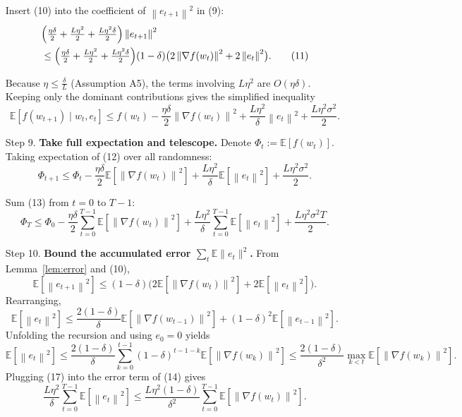 \documentclass{article}
\newcommand{\E}{\mathbb{E}}
\newcommand{\norm}[1]{\left\|#1\right\|}
\begin{document}
\begin{enumerate}
Insert (10) into the coefficient of $\norm{e_{t+1}}^{2}$ in (9):
\[
\begin{aligned}
&\Bigl(\tfrac{\eta\delta}{2}+ \tfrac{L\eta^{2}}{2}
            +\tfrac{L\eta^{2}\delta}{2}\Bigr)\norm{e_{t+1}}^{2}  \\
&\le \Bigl(\tfrac{\eta\delta}{2}+ \tfrac{L\eta^{2}}{2}
            +\tfrac{L\eta^{2}\delta}{2}\Bigr)(1-\delta)
      \bigl(2\norm{\nabla f(w_{t})}^{2}+2\norm{e_{t}}^{2}\bigr). \tag{11}
\end{aligned}
\]

Because $\eta\le \frac{\delta}{L}$ (Assumption A5), the terms involving $L\eta^{2}$
are $O(\eta\delta)$.  Keeping only the dominant contributions gives the simplified
inequality
\[
\E\!\left[f(w_{t+1})\mid w_{t},e_{t}\right]
\le f(w_{t})
      -\frac{\eta\delta}{2}\norm{\nabla f(w_{t})}^{2}
      +\frac{L\eta^{2}}{\delta}\norm{e_{t}}^{2}
      +\frac{L\eta^{2}\sigma^{2}}{2}. \tag{12}
\]

\item[Step 9.] \textbf{Take full expectation and telescope.}
Denote $\Phi_{t}:=\E[f(w_{t})]$. Taking expectation of (12) over all randomness:
\[
\Phi_{t+1}\le \Phi_{t}
      -\frac{\eta\delta}{2}\E\!\left[\norm{\nabla f(w_{t})}^{2}\right]
      +\frac{L\eta^{2}}{\delta}\E\!\left[\norm{e_{t}}^{2}\right]
      +\frac{L\eta^{2}\sigma^{2}}{2}. \tag{13}
\]

Sum (13) from $t=0$ to $T-1$:
\[
\Phi_{T}\le \Phi_{0}
      -\frac{\eta\delta}{2}\sum_{t=0}^{T-1}
          \E\!\left[\norm{\nabla f(w_{t})}^{2}\right]
      +\frac{L\eta^{2}}{\delta}\sum_{t=0}^{T-1}
          \E\!\left[\norm{e_{t}}^{2}\right]
      +\frac{L\eta^{2}\sigma^{2}T}{2}. \tag{14}
\]

\item[Step 10.] \textbf{Bound the accumulated error $\sum_{t}\E\|e_{t}\|^{2}$.}
From Lemma~\ref{lem:error} and (10),
\[
\E\!\left[\norm{e_{t+1}}^{2}\right]\le (1-\delta)
      \bigl(2\E\!\left[\norm{\nabla f(w_{t})}^{2}\right]
            +2\E\!\left[\norm{e_{t}}^{2}\right]\bigr). \tag{15}
\]
Rearranging,
\[
\E\!\left[\norm{e_{t}}^{2}\right]\le
\frac{2(1-\delta)}{\delta}\E\!\left[\norm{\nabla f(w_{t-1})}^{2}\right]
     + (1-\delta)^{2}\E\!\left[\norm{e_{t-1}}^{2}\right]. \tag{16}
\]
Unfolding the recursion and using $e_{0}=0$ yields
\[
\E\!\left[\norm{e_{t}}^{2}\right]\le
\frac{2(1-\delta)}{\delta}\sum_{k=0}^{t-1}(1-\delta)^{t-1-k}
      \E\!\left[\norm{\nabla f(w_{k})}^{2}\right]
\le\frac{2(1-\delta)}{\delta^{2}}\max_{k<t}\E\!\left[\norm{\nabla f(w_{k})}^{2}\right].
\tag{17}
\]
Plugging (17) into the error term of (14) gives
\[
\frac{L\eta^{2}}{\delta}\sum_{t=0}^{T-1}\E\!\left[\norm{e_{t}}^{2}\right]
\le
\frac{L\eta^{2}(1-\delta)}{\delta^{2}}\sum_{t=0}^{T-1}
      \E\!\left[\norm{\nabla f(w_{t})}^{2}\right]. \tag{18}
\]


\end{enumerate}
\end{document}

